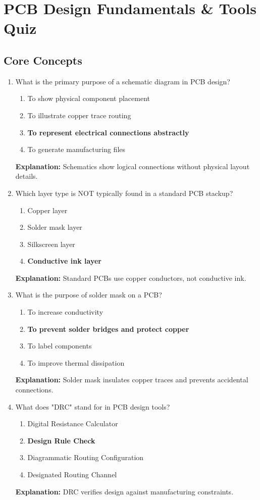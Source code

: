 \documentclass{article}
\begin{document}
	
	\section*{PCB Design Fundamentals \& Tools Quiz}
	
	\subsection*{Core Concepts}
	
	\begin{enumerate}
		\item What is the primary purpose of a schematic diagram in PCB design?
		\begin{enumerate}
			\item To show physical component placement
			\item To illustrate copper trace routing
			\item \textbf{To represent electrical connections abstractly}
			\item To generate manufacturing files
		\end{enumerate}
		\textbf{Explanation:} Schematics show logical connections without physical layout details.
		
		\item Which layer type is NOT typically found in a standard PCB stackup?
		\begin{enumerate}
			\item Copper layer
			\item Solder mask layer
			\item Silkscreen layer
			\item \textbf{Conductive ink layer}
		\end{enumerate}
		\textbf{Explanation:} Standard PCBs use copper conductors, not conductive ink.
		
		\item What is the purpose of solder mask on a PCB?
		\begin{enumerate}
			\item To increase conductivity
			\item \textbf{To prevent solder bridges and protect copper}
			\item To label components
			\item To improve thermal dissipation
		\end{enumerate}
		\textbf{Explanation:} Solder mask insulates copper traces and prevents accidental connections.
		
		\item What does "DRC" stand for in PCB design tools?
		\begin{enumerate}
			\item Digital Resistance Calculator
			\item \textbf{Design Rule Check}
			\item Diagrammatic Routing Configuration
			\item Designated Routing Channel
		\end{enumerate}
		\textbf{Explanation:} DRC verifies design against manufacturing constraints.
		

\end{enumerate}
\end{document}
